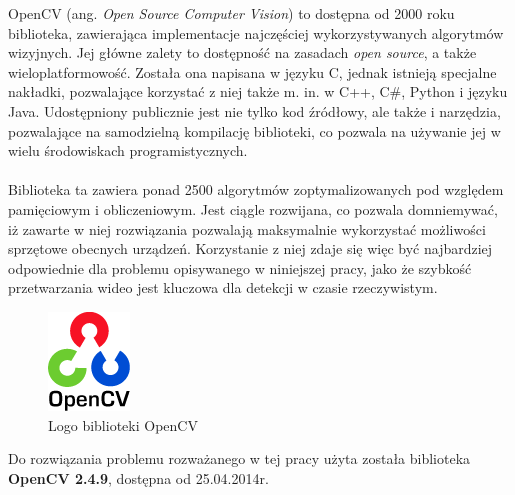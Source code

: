 OpenCV (ang. \textit{Open Source Computer Vision}) to dostępna od 2000 roku biblioteka, zawierająca implementacje najczęściej wykorzystywanych algorytmów wizyjnych. Jej główne zalety to dostępność na zasadach \textit{open source}, a także wieloplatformowość. Została ona napisana w języku C, jednak istnieją specjalne nakładki, pozwalające korzystać z niej także m. in. w C++, C\#, Python i języku Java. Udostępniony publicznie jest nie tylko kod źródłowy, ale także i narzędzia, pozwalające na samodzielną kompilację biblioteki, co pozwala na używanie jej w wielu środowiskach programistycznych.
\paragraph{}
Biblioteka ta zawiera ponad 2500 algorytmów zoptymalizowanych pod względem pamięciowym i obliczeniowym. Jest ciągle rozwijana, co pozwala domniemywać, iż zawarte w niej rozwiązania pozwalają maksymalnie wykorzystać możliwości sprzętowe obecnych urządzeń. Korzystanie z niej zdaje się więc być najbardziej odpowiednie dla problemu opisywanego w niniejszej pracy, jako że szybkość przetwarzania wideo jest kluczowa dla detekcji w czasie rzeczywistym.
\begin{figure}[!htb]
\centering

\includegraphics[width=82px]{img/ocv_logo}
\caption{Logo biblioteki OpenCV \cite{OpenCVLogo}}
\end{figure}

Do rozwiązania problemu rozważanego w tej pracy użyta została biblioteka \textbf{OpenCV 2.4.9}, dostępna od 25.04.2014r.